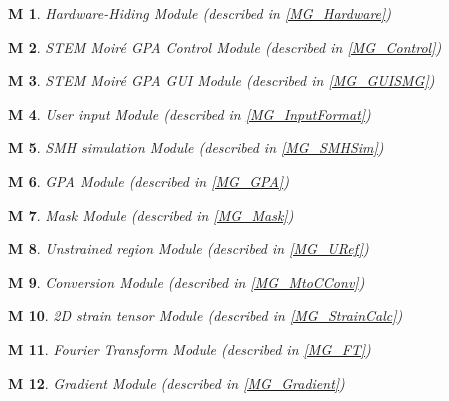\documentclass[12pt, titlepage]{article}
\newcommand{\progname}{STEM Moir{\'e} GPA}
\newtheorem{M}{M}
\begin{document}
\begin{M}\normalfont Hardware-Hiding Module (described in \cref{MG_Hardware})
\label{M_Hardware}
\end{M}

\begin{M}\normalfont \progname{}  Control Module (described in \cref{MG_Control})
\label{M_Control}
\end{M}

\begin{M}\normalfont \progname{} GUI Module (described in \cref{MG_GUISMG})
\label{M_GUISMG}
\end{M}

\begin{M}\normalfont User input Module (described in \cref{MG_InputFormat})
\label{M_InputFormat}
\end{M}

\begin{M}\normalfont SMH simulation Module (described in \cref{MG_SMHSim})
\label{M_SMHSim}
\end{M}

\begin{M}\normalfont GPA Module (described in \cref{MG_GPA})
\label{M_GPA}
\end{M}

\begin{M}\normalfont Mask Module (described in \cref{MG_Mask})
\label{M_Mask}
\end{M}

\begin{M}\normalfont Unstrained region Module (described in \cref{MG_URef})
\label{M_URef}
\end{M}

\begin{M}\normalfont Conversion Module (described in \cref{MG_MtoCConv})
\label{M_MtoCConv}
\end{M}

\begin{M}\normalfont 2D strain tensor Module (described in \cref{MG_StrainCalc})
\label{M_StrainCalc}
\end{M}

\begin{M}\normalfont Fourier Transform Module (described in \cref{MG_FT})
\label{M_FT}
\end{M}

\begin{M}\normalfont Gradient Module (described in \cref{MG_Gradient})
\label{M_Gradient}
\end{M}
\end{document}
